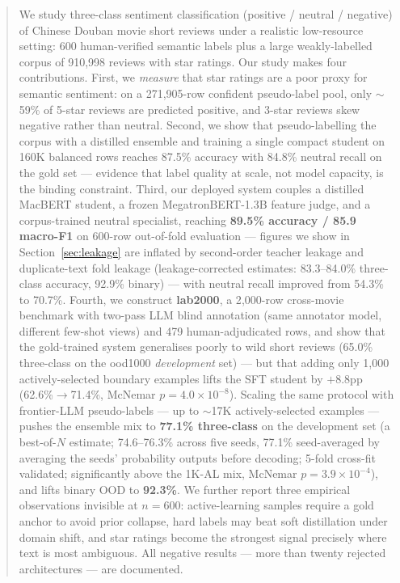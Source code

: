 \documentclass[11pt,a4paper]{article}
\begin{document}
\begin{abstract}
\begingroup
\small
\noindent
We study three-class sentiment classification (positive / neutral /
negative) of Chinese Douban movie short reviews under a realistic
low-resource setting: 600 human-verified semantic labels plus a large
weakly-labelled corpus of 910{,}998 reviews with star ratings. Our study
makes four contributions. First, we \emph{measure} that star ratings are
a poor proxy for semantic sentiment: on a 271{,}905-row confident
pseudo-label pool, only $\sim$59\% of 5-star reviews are predicted
positive, and 3-star reviews skew negative rather than neutral.
Second, we show that pseudo-labelling the corpus with a distilled
ensemble and training a single compact student on 160K balanced rows
reaches 87.5\% accuracy with 84.8\% neutral recall on the gold set ---
evidence that label quality at scale, not model capacity, is the binding
constraint. Third, our deployed system couples a distilled MacBERT
student, a frozen MegatronBERT-1.3B feature judge, and a
corpus-trained neutral specialist, reaching \textbf{89.5\% accuracy /
85.9 macro-F1} on 600-row out-of-fold evaluation --- figures we show in
Section~\ref{sec:leakage} are inflated by second-order teacher leakage
and duplicate-text fold leakage
(leakage-corrected estimates: 83.3--84.0\% three-class accuracy,
92.9\% binary) --- with neutral recall
improved from 54.3\% to 70.7\%. Fourth, we construct \textbf{lab2000},
a 2{,}000-row cross-movie benchmark with two-pass LLM blind
annotation (same annotator model, different few-shot views) and
479 human-adjudicated rows, and show that the gold-trained system
generalises poorly to wild short reviews (65.0\% three-class on the
ood1000 \emph{development} set) --- but
that adding only 1{,}000 actively-selected boundary examples lifts the
SFT student by $+8.8$pp (62.6\%$\to$71.4\%, McNemar
$p = 4.0\times10^{-8}$).
Scaling the same protocol with frontier-LLM pseudo-labels --- up to
$\sim$17K actively-selected examples --- pushes the ensemble mix to
\textbf{77.1\% three-class} on the development set (a best-of-$N$
estimate; 74.6--76.3\% across five seeds,
77.1\% seed-averaged by averaging the seeds' probability outputs
before decoding; 5-fold cross-fit validated; significantly above
the 1K-AL mix, McNemar $p = 3.9\times10^{-4}$), and lifts
binary OOD to \textbf{92.3\%}. We
further report three empirical observations invisible at $n{=}600$:
active-learning
samples require a gold anchor to avoid prior collapse, hard labels may
beat soft distillation under domain shift, and star ratings become the
strongest signal precisely where text is most ambiguous. All negative
results --- more than twenty rejected architectures --- are documented.
\par\endgroup
\end{abstract}
\end{document}

